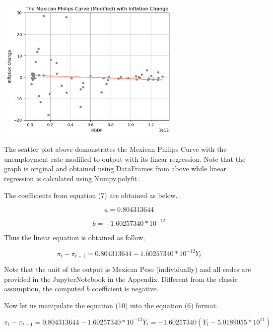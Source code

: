 \documentclass{article}
\begin{document}
\pagebreak

    \begin{center}
        \includegraphics[width=9cm, height=7cm]{The Mexican Philips Curve Zoomed in.png}\\
        \textcolor{gray}{\footnotesize{}}
    \end{center}
    
    {The scatter plot above demonstrates the Mexican Philips Curve with the unemployment rate modified to output with its linear regression. Note that the graph is original and obtained using DataFrames from above while linear regression is calculated using Numpy.polyfit.}

    {The coefficients from equation (7) are obtained as below.}

    \begin{equation}
        a = 0.804313644
    \end{equation}

    \begin{equation}
        b = -1.60257340 * 10^{-12}
    \end{equation}

    {Thus the linear equation is obtained as follow,}

    \begin{equation}
        \pi_t - \pi_{t-1} = 0.804313644 - 1.60257340 * 10^{-12} Y_t
    \end{equation}

    {Note that the unit of the output is Mexican Peso (individually) and all codes are provided in the JupyterNotebook in the Appendix. Different from the classic assumption, the computed $b$ coefficient is negative.}

    {Now let us manipulate the equation (10) into the equation (6) format.}

    \begin{equation}
        \pi_t - \pi_{t-1} = 0.804313644 - 1.60257340 * 10^{-12} Y_t = -1.60257340 (Y_t - 5.0189055 * 10^{11})
    \end{equation}
\end{document}
